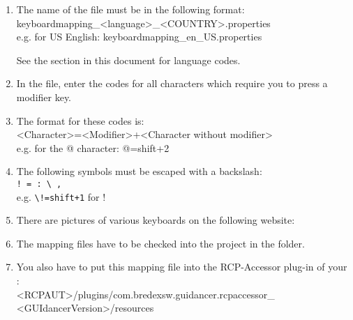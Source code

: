 \begin{enumerate}
\item The name of the file must be in the following format:\\
keyboardmapping\_<language>\_<COUNTRY>.properties\\
e.g. for US English: keyboardmapping\_en\_US.properties

See the section in this document  for language codes.
\item In the file, enter the codes for all characters which require you to press a modifier key. 
\item The format for these codes is:\\
<Character>=<Modifier>+<Character without modifier>\\
e.g. for the @ character: @=shift+2
\item The following symbols must be escaped with a backslash:\\
\verb+! = : \ ,+\\
e.g. \verb?\!=shift+1? for !
\item There are pictures of various keyboards on the following website:\\
\item The mapping files have to be checked into the  project in the  folder.  
\item You also have to put this mapping file into the RCP-Accessor plug-in of your \gdaut{}:\\

<RCPAUT>/plugins/com.bredexsw.guidancer.rcpaccessor\_\\
<GUIdancerVersion>/resources


\end{enumerate}

